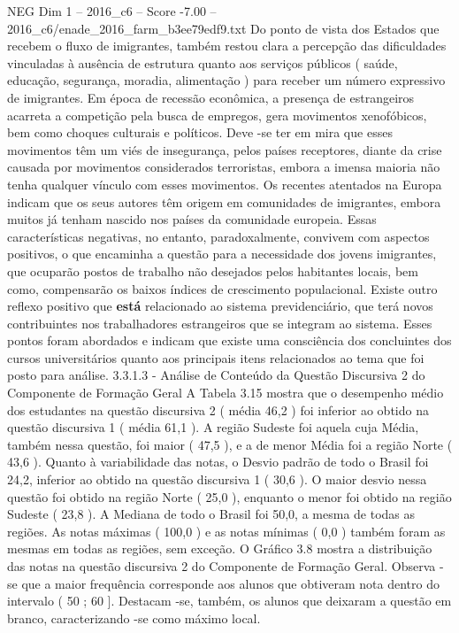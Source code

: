 \begin{textsample}{NEG Dim 1 – 2016\_c6 – Score -7.00 – 2016\_c6/enade\_2016\_farm\_b3ee79edf9.txt}
Do ponto de vista dos Estados que recebem o fluxo de imigrantes, também restou clara a percepção das dificuldades vinculadas à ausência de estrutura quanto aos serviços públicos ( saúde, educação, segurança, moradia, alimentação ) para receber um número expressivo de imigrantes.
Em época de recessão econômica, a presença de estrangeiros acarreta a competição pela busca de empregos, gera movimentos xenofóbicos, bem como choques culturais e políticos.
Deve -se ter em mira que esses movimentos têm um viés de insegurança, pelos países receptores, diante da crise causada por movimentos considerados terroristas, embora a imensa maioria não tenha qualquer vínculo com esses movimentos.
Os recentes atentados na Europa indicam que os seus autores têm origem em comunidades de imigrantes, embora muitos já tenham nascido nos países da comunidade europeia.
Essas características negativas, no entanto, paradoxalmente, convivem com aspectos positivos, o que encaminha a questão para a necessidade dos jovens imigrantes, que ocuparão postos de trabalho não desejados pelos habitantes locais, bem como, compensarão os baixos índices de crescimento populacional.
Existe outro reflexo positivo que \textbf{está} relacionado ao sistema previdenciário, que terá novos contribuintes nos trabalhadores estrangeiros que se integram ao sistema.
Esses pontos foram abordados e indicam que existe uma consciência dos concluintes dos cursos universitários quanto aos principais itens relacionados ao tema que foi posto para análise. 3.3.1.3 - Análise de Conteúdo da Questão Discursiva 2 do Componente de Formação Geral A Tabela 3.15 mostra que o desempenho médio dos estudantes na questão discursiva 2 ( média 46,2 ) foi inferior ao obtido na questão discursiva 1 ( média 61,1 ).
A região Sudeste foi aquela cuja Média, também nessa questão, foi maior ( 47,5 ), e a de menor Média foi a região Norte ( 43,6 ).
Quanto à variabilidade das notas, o Desvio padrão de todo o Brasil foi 24,2, inferior ao obtido na questão discursiva 1 ( 30,6 ).
O maior desvio nessa questão foi obtido na região Norte ( 25,0 ), enquanto o menor foi obtido na região Sudeste ( 23,8 ).
A Mediana de todo o Brasil foi 50,0, a mesma de todas as regiões.
As notas máximas ( 100,0 ) e as notas mínimas ( 0,0 ) também foram as mesmas em todas as regiões, sem exceção.
O Gráfico 3.8 mostra a distribuição das notas na questão discursiva 2 do Componente de Formação Geral.
Observa -se que a maior frequência corresponde aos alunos que obtiveram nota dentro do intervalo ( 50 ; 60 ].
Destacam -se, também, os alunos que deixaram a questão em branco, caracterizando -se como máximo local.

\end{textsample}
